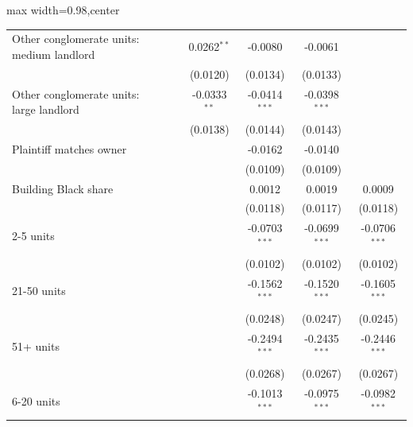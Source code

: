 \begin{table}[htbp]
\begin{adjustbox}{max width=0.98\textwidth,center}
\begin{tabular}{lccccc}
         Other conglomerate units: medium landlord  &                 & 0.0262$^{**}$   & -0.0080         & -0.0061         &   \\   
                                                    &                 & (0.0120)        & (0.0134)        & (0.0133)        &   \\   
         Other conglomerate units: large landlord   &                 & -0.0333$^{**}$  & -0.0414$^{***}$ & -0.0398$^{***}$ &   \\   
                                                    &                 & (0.0138)        & (0.0144)        & (0.0143)        &   \\   
         Plaintiff matches owner                    &                 &                 & -0.0162         & -0.0140         &   \\   
                                                    &                 &                 & (0.0109)        & (0.0109)        &   \\   
         Building Black share                       &                 &                 & 0.0012          & 0.0019          & 0.0009\\   
                                                    &                 &                 & (0.0118)        & (0.0117)        & (0.0118)\\   
         2-5 units                                  &                 &                 & -0.0703$^{***}$ & -0.0699$^{***}$ & -0.0706$^{***}$\\   
                                                    &                 &                 & (0.0102)        & (0.0102)        & (0.0102)\\   
         21-50 units                                &                 &                 & -0.1562$^{***}$ & -0.1520$^{***}$ & -0.1605$^{***}$\\   
                                                    &                 &                 & (0.0248)        & (0.0247)        & (0.0245)\\   
         51+ units                                  &                 &                 & -0.2494$^{***}$ & -0.2435$^{***}$ & -0.2446$^{***}$\\   
                                                    &                 &                 & (0.0268)        & (0.0267)        & (0.0267)\\   
         6-20 units                                 &                 &                 & -0.1013$^{***}$ & -0.0975$^{***}$ & -0.0982$^{***}$\\   

\end{tabular}
\end{adjustbox}
\end{table}
